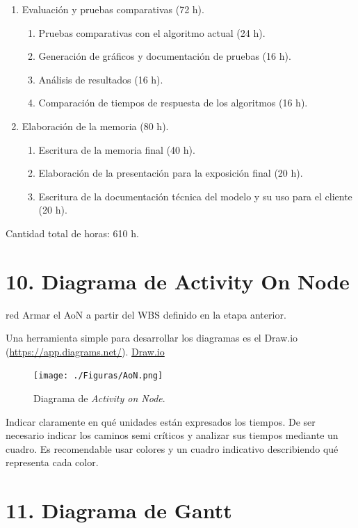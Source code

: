 \documentclass[
11pt, %
]{charter}
\begin{document}
\begin{enumerate}
\item Evaluación y pruebas comparativas (72 h).
	\begin{enumerate}
	\item Pruebas comparativas con el algoritmo actual (24 h).
	\item Generación de gráficos y documentación de pruebas (16 h).
	\item Análisis de resultados (16 h).
	\item Comparación de tiempos de respuesta de los algoritmos (16 h).
	\end{enumerate}
\item Elaboración de la memoria (80 h).
	\begin{enumerate}
	\item Escritura de la memoria final (40 h).
	\item Elaboración de la presentación para la exposición final (20 h).
	\item Escritura de la documentación técnica del modelo y su uso para el cliente (20 h).
	\end{enumerate}
\end{enumerate}

Cantidad total de horas: 610 h.

\section{10. Diagrama de Activity On Node}
\label{sec:AoN}

\begin{consigna}{red}
Armar el AoN a partir del WBS definido en la etapa anterior.

Una herramienta simple para desarrollar los diagramas es el Draw.io (\url{https://app.diagrams.net/}).
\href{https://app.diagrams.net}{Draw.io}


\begin{figure}[htpb]
\centering 
\texttt{[image: ./Figuras/AoN.png]}
\caption{Diagrama de \textit{Activity on Node}.}
\label{fig:AoN}
\end{figure}

Indicar claramente en qué unidades están expresados los tiempos.
De ser necesario indicar los caminos semi críticos y analizar sus tiempos mediante un cuadro.
Es recomendable usar colores y un cuadro indicativo describiendo qué representa cada color.

\end{consigna}

\section{11. Diagrama de Gantt}
\label{sec:gantt}
\end{document}
